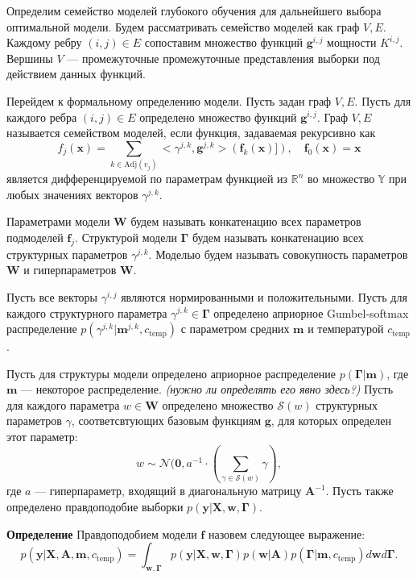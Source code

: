 \documentclass[12pt]{article}
\begin{document}
Определим семейство моделей глубокого обучения для дальнейшего выбора оптимальной модели. 
Будем рассматривать семейство моделей как граф $V,E$. Каждому ребру $(i,j) \in E$ сопоставим множество функций $\mathbf{g}^{i,j}$ мощности $K^{i,j}$. Вершины $V$ --- промежуточные промежуточные представления выборки под действием данных функций. 

Перейдем к формальному определению модели.
Пусть задан граф $V,E$. Пусть для каждого ребра $(i,j) \in E$ определено множество функций $\mathbf{g}^{i,j}.$ Граф $V, E$ называется семейством моделей, если функция, задаваемая рекурсивно как 
\[
    f_j(\mathbf{x}) = \sum_{k \in \text{Adj}(v_j)} <\gamma^{j,k}, \mathbf{g}^{j,k}>\left(\mathbf{f}_k(\mathbf{x})]\right), \quad \mathbf{f}_0(\mathbf{x}) = \mathbf{x}
\]
является дифференцируемой по параметрам функцией из $\mathbb{R}^n$ во множество $\mathbb{Y}$ при любых значениях векторов $\gamma^{j,k}$.

Параметрами модели $\mathbf{W}$ будем называть конкатенацию всех параметров подмоделей $\mathbf{f}_j$.
Структурой модели $\boldsymbol{\Gamma}$ будем называть конкатенацию всех структурных параметров $\gamma^{j,k}$.
Моделью будем называть совокупность параметров $\mathbf{W}$ и гиперпараметров $\mathbf{W}$.

Пусть все векторы $\gamma^{i,j}$ являются нормированными и положительными.
Пусть для каждого структурного параметра $\gamma^{j,k} \in \boldsymbol{\Gamma}$ определено априорное Gumbel-softmax распределение $p(\gamma^{j,k}|\mathbf{m}^{j,k}, c_{\text{temp}})$ с параметром средних $\mathbf{m}$ и температурой $c_{\text{temp}}$. 
 
Пусть для структуры модели определено априорное распределение $p(\boldsymbol{\Gamma}|\mathbf{m})$, где $\mathbf{m}$ --- некоторое распределение. \textit{(нужно ли определять его явно здесь?)}
Пусть для каждого параметра $w \in \mathbf{W}$ определено множество $\mathcal{S}(w)$ структурных параметров $\gamma$, соответсвтующих базовым функциям $\mathbf{g}$, для которых определен этот параметр:
\[
    {w} \sim \mathcal{N}(\mathbf{0}, {a}^{-1} \cdot (\sum_{\gamma \in \mathcal{S}(w)}\gamma),
\]
где $a$ --- гиперпараметр, входящий в диагональную матрицу $\mathbf{A}^{-1}$.
Пусть также определено правдоподобие выборки $p(\mathbf{y}|\mathbf{X}, \mathbf{w}, \boldsymbol{\Gamma}).$

\textbf{Определение} Правдоподобием модели $\mathbf{f}$ назовем следующее выражение: 
\begin{equation}
\label{eq:evidence}
	p(\mathbf{y}|\mathbf{X},\mathbf{A},\mathbf{m}, c_{\text{temp}}) = \int_{\mathbf{w}, \boldsymbol{\Gamma} } p(\mathbf{y}|\mathbf{X},\mathbf{w},  \boldsymbol{\Gamma})p(\mathbf{w}|\mathbf{A})p(\boldsymbol{\Gamma}|\mathbf{m}, c_{\text{temp}})d\mathbf{w}d\mathbf{\Gamma}.
\end{equation}
\end{document}
